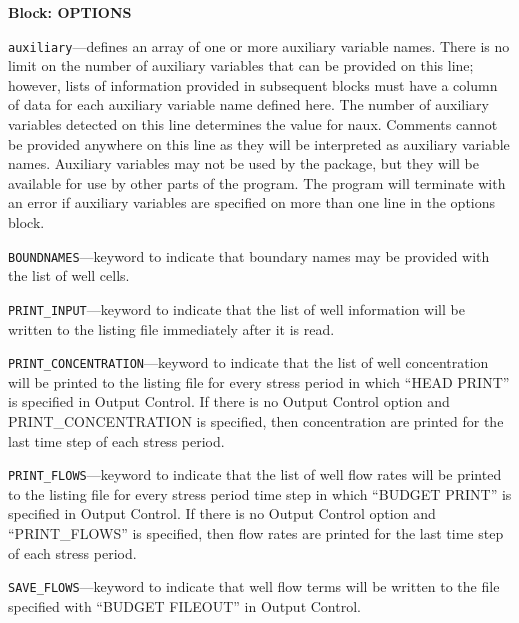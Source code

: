 
\item \textbf{Block: OPTIONS}

\begin{description}
\item \texttt{auxiliary}---defines an array of one or more auxiliary variable names.  There is no limit on the number of auxiliary variables that can be provided on this line; however, lists of information provided in subsequent blocks must have a column of data for each auxiliary variable name defined here.   The number of auxiliary variables detected on this line determines the value for naux.  Comments cannot be provided anywhere on this line as they will be interpreted as auxiliary variable names.  Auxiliary variables may not be used by the package, but they will be available for use by other parts of the program.  The program will terminate with an error if auxiliary variables are specified on more than one line in the options block.

\item \texttt{BOUNDNAMES}---keyword to indicate that boundary names may be provided with the list of well cells.

\item \texttt{PRINT\_INPUT}---keyword to indicate that the list of well information will be written to the listing file immediately after it is read.

\item \texttt{PRINT\_CONCENTRATION}---keyword to indicate that the list of well concentration will be printed to the listing file for every stress period in which ``HEAD PRINT'' is specified in Output Control.  If there is no Output Control option and PRINT\_CONCENTRATION is specified, then concentration are printed for the last time step of each stress period.

\item \texttt{PRINT\_FLOWS}---keyword to indicate that the list of well flow rates will be printed to the listing file for every stress period time step in which ``BUDGET PRINT'' is specified in Output Control.  If there is no Output Control option and ``PRINT\_FLOWS'' is specified, then flow rates are printed for the last time step of each stress period.

\item \texttt{SAVE\_FLOWS}---keyword to indicate that well flow terms will be written to the file specified with ``BUDGET FILEOUT'' in Output Control.


\end{description}
